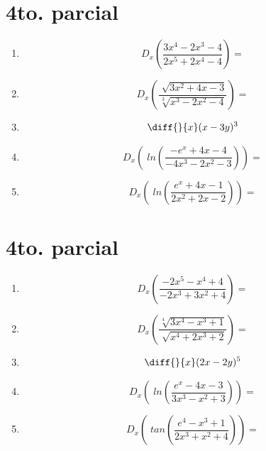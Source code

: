 \documentclass[oneside,spanish,letter]{article}
\begin{document}
\section{4to. parcial}
\begin{enumerate}
 \item $$ D_x \left( \frac{3x^4-2x^3-4}{2x^5+2x^4-4}\right)=$$
 \item $$ D_x \left( \frac{\sqrt[]{3x^2+4x-3}}{\sqrt[3]{x^3-2x^2-4}}\right)=$$
\item $$\diff{}{x}(x-3y)^3$$
 \item $$ D_x \left(\;ln\left( \frac{-e^x+4x-4}{-4x^3-2x^2-3}\right)\right)=$$
 \item $$ D_x \left(\;ln\left( \frac{e^x+4x-1}{2x^2+2x-2}\right)\right)=$$
 \end{enumerate}
  \newpage
\section{4to. parcial}
\begin{enumerate}
 \item $$ D_x \left( \frac{-2x^5-x^4+4}{-2x^3+3x^2+4}\right)=$$
 \item $$ D_x \left( \frac{\sqrt[4]{3x^4-x^3+1}}{\sqrt[]{x^4+2x^3+2}}\right)=$$
\item $$\diff{}{x}(2x-2y)^5$$
 \item $$ D_x \left(\;ln\left( \frac{e^x-4x-3}{3x^3-x^2+3}\right)\right)=$$
 \item $$ D_x \left(\;tan\left( \frac{e^4-x^3+1}{2x^3+x^2+4}\right)\right)=$$
 \end{enumerate}
  \newpage
\end{document}
